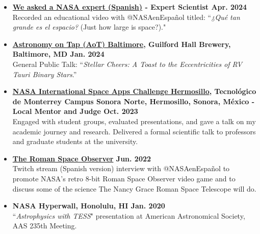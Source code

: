 \documentclass[12pt]{article}
\begin{document}
\begin{itemize}
    \item  \textbf{\href{https://youtu.be/DMUk448-734?si=yv1RBLK9qMrYYNFq}{We asked a NASA expert (Spanish)} - Expert Scientist \hfill Apr. 2024}\\
    Recorded an educational video with @NASAenEspañol titled: ``\textit{¿Qu\'e tan grande es el espacio?} (Just how large is space?)."
    \item \textbf{\href{https://astronomyontap.org/event/astronomy-on-tap-baltimore-january-edition/}{Astronomy on Tap (AoT) Baltimore}, Guilford Hall Brewery, Baltimore, MD \hfill Jan. 2024} \\
    General Public Talk: ``\textit{Stellar Cheers: A Toast to the Eccentricities of RV Tauri Binary Stars}.''
    \item \textbf{\href{https://www.spaceappschallenge.org/2023/locations/hermosillo/?tab=schedule}{NASA International Space Apps Challenge Hermosillo}, Tecnol\'{o}gico de Monterrey Campus Sonora Norte, Hermosillo, Sonora, M\'{e}xico - Local Mentor and Judge \hfill Oct. 2023} \\
    Engaged with student groups, evaluated presentations, and gave a talk on my academic journey and research. Delivered a formal scientific talk to professors and graduate students at the university.
    \item \textbf{\href{https://www.twitch.tv/videos/1316037901}{The Roman Space Observer} \hfill Jun. 2022} \\
    Twitch stream (Spanish version) interview with @NASAenEspa\~nol to promote NASA's retro 8-bit Roman Space Observer video game and to discuss some of the science The Nancy Grace Roman Space Telescope will do.
    \item \textbf{NASA Hyperwall, Honolulu, HI \hfill  Jan. 2020} \\ ``{\it Astrophysics with TESS}" presentation at American Astronomical Society, AAS 235th Meeting.
\end{itemize}

\end{document}
